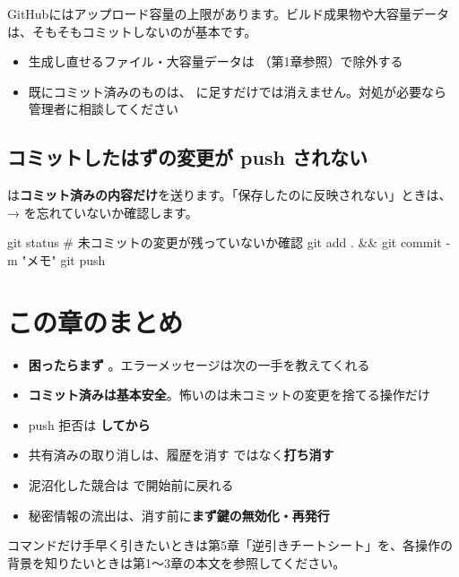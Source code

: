 GitHubにはアップロード容量の上限があります。ビルド成果物や大容量データは、そもそもコミットしないのが基本です。

\begin{itemize}[leftmargin=1.4em]
  \item 生成し直せるファイル・大容量データは （第1章参照）で除外する
  \item 既にコミット済みのものは、 に足すだけでは消えません。対処が必要なら管理者に相談してください
\end{itemize}

\subsection{コミットしたはずの変更が push されない}

 は\textbf{コミット済みの内容だけ}を送ります。「保存したのに反映されない」ときは、 →  を忘れていないか確認します。

\begin{codebox}[bash]
\begin{code}
git status                    # 未コミットの変更が残っていないか確認
git add . && git commit -m "メモ"
git push
\end{code}
\end{codebox}

\section*{この章のまとめ}

\begin{itemize}[leftmargin=1.4em]
  \item \textbf{困ったらまず }。エラーメッセージは次の一手を教えてくれる
  \item \textbf{コミット済みは基本安全}。怖いのは未コミットの変更を捨てる操作だけ
  \item push 拒否は \textbf{ してから }
  \item 共有済みの取り消しは、履歴を消す  ではなく\textbf{打ち消す }
  \item 泥沼化した競合は \textbf{} で開始前に戻れる
  \item 秘密情報の流出は、消す前に\textbf{まず鍵の無効化・再発行}
\end{itemize}

コマンドだけ手早く引きたいときは第5章「逆引きチートシート」を、各操作の背景を知りたいときは第1〜3章の本文を参照してください。
